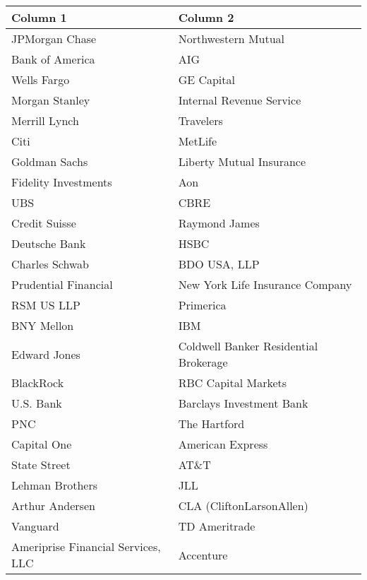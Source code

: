 
\centering
\begin{tabular}{p{7cm}p{7cm}}
\toprule
Column 1 & Column 2 \\
\midrule
JPMorgan Chase & Northwestern Mutual \\
Bank of America & AIG \\
Wells Fargo & GE Capital \\
Morgan Stanley & Internal Revenue Service \\
Merrill Lynch & Travelers \\
Citi & MetLife \\
Goldman Sachs & Liberty Mutual Insurance \\
Fidelity Investments & Aon \\
UBS & CBRE \\
Credit Suisse & Raymond James \\
Deutsche Bank & HSBC \\
Charles Schwab & BDO USA, LLP \\
Prudential Financial & New York Life Insurance Company \\
RSM US LLP & Primerica \\
BNY Mellon & IBM \\
Edward Jones & Coldwell Banker Residential Brokerage \\
BlackRock & RBC Capital Markets \\
U.S. Bank & Barclays Investment Bank \\
PNC & The Hartford \\
Capital One & American Express \\
State Street & AT\&T \\
Lehman Brothers & JLL \\
Arthur Andersen & CLA (CliftonLarsonAllen) \\
Vanguard & TD Ameritrade \\
Ameriprise Financial Services, LLC & Accenture \\

\bottomrule
\end{tabular}
